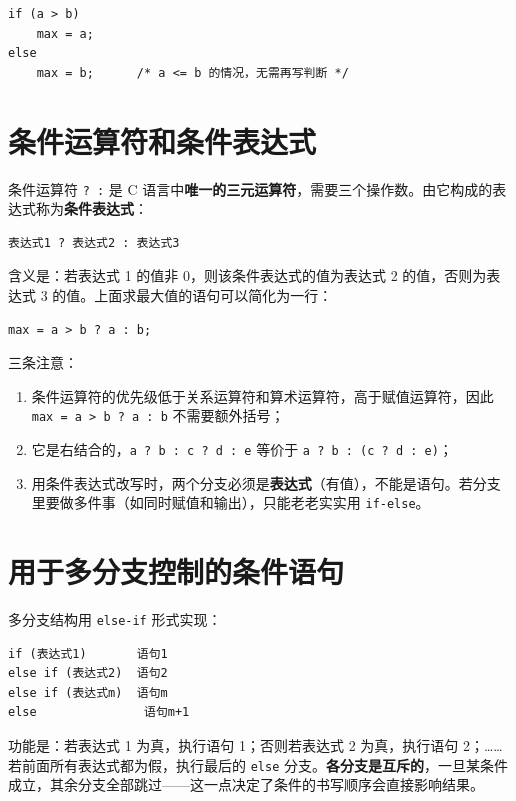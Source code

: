 \begin{lstlisting}
if (a > b)
    max = a;
else
    max = b;      /* a <= b 的情况，无需再写判断 */
\end{lstlisting}

\section{条件运算符和条件表达式}

条件运算符 \texttt{? :} 是 C 语言中\textbf{唯一的三元运算符}，需要三个操作数。由它构成的表达式称为\textbf{条件表达式}：

\begin{lstlisting}
表达式1 ? 表达式2 : 表达式3
\end{lstlisting}

含义是：若表达式 1 的值非 0，则该条件表达式的值为表达式 2 的值，否则为表达式 3 的值。上面求最大值的语句可以简化为一行：

\begin{lstlisting}
max = a > b ? a : b;
\end{lstlisting}

三条注意：

\begin{enumerate}
  \item 条件运算符的优先级低于关系运算符和算术运算符，高于赋值运算符，因此 \texttt{max = a > b ? a : b} 不需要额外括号；
  \item 它是右结合的，\texttt{a ? b : c ? d : e} 等价于 \texttt{a ? b : (c ? d : e)}；
  \item 用条件表达式改写时，两个分支必须是\textbf{表达式}（有值），不能是语句。若分支里要做多件事（如同时赋值和输出），只能老老实实用 \texttt{if-else}。
\end{enumerate}

\section{用于多分支控制的条件语句}

多分支结构用 \texttt{else-if} 形式实现：

\begin{lstlisting}
if (表达式1)       语句1
else if (表达式2)  语句2
else if (表达式m)  语句m
else               语句m+1
\end{lstlisting}

功能是：若表达式 1 为真，执行语句 1；否则若表达式 2 为真，执行语句 2；……若前面所有表达式都为假，执行最后的 \texttt{else} 分支。\textbf{各分支是互斥的}，一旦某条件成立，其余分支全部跳过——这一点决定了条件的书写顺序会直接影响结果。

